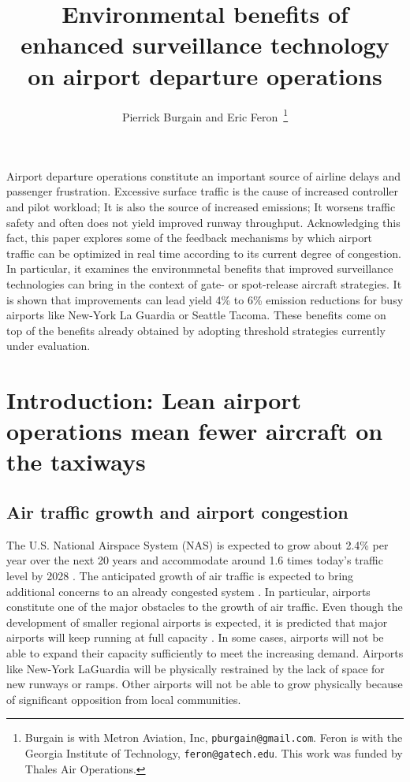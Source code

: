 \documentclass[letterpaper]{article}
\title{Environmental benefits of enhanced surveillance technology on airport departure operations}
\author{Pierrick Burgain and Eric Feron~\thanks{Burgain is with Metron Aviation, Inc, {\tt pburgain@gmail.com}. Feron is with the Georgia Institute of Technology, {\tt feron@gatech.edu}. This work was funded by Thales Air Operations.}}
\begin{document}

\maketitle


Airport departure operations constitute an important source of airline delays and passenger frustration. Excessive surface traffic is the cause of increased controller and pilot workload; It is also the source of increased emissions; It worsens traffic safety and often does not yield improved runway throughput. Acknowledging this fact, this paper explores some of the feedback mechanisms by which airport traffic can be optimized in real time according to its current degree of congestion. In particular, it examines the environmnetal benefits that improved surveillance technologies can bring in the context of gate- or spot-release aircraft strategies.
It is shown that improvements can lead yield 4\% to 6\% emission reductions for busy airports like New-York La Guardia or Seattle Tacoma. These benefits come on top of the benefits already obtained by adopting threshold strategies currently under evaluation.

\section{Introduction: Lean airport operations mean fewer aircraft on the taxiways}

\subsection{Air traffic growth and airport congestion}
The U.S. National Airspace System (NAS) is expected to grow about 2.4\% per year over the next 20 years and accommodate around 1.6 times today's traffic level by 2028 \cite{greenair2010,nextGen,Ky2006,Arbuckle2006}. The anticipated growth of air traffic is expected to bring additional concerns to an already congested system  \cite{Joint2004, Thanh2006}. In particular, airports constitute one of the major obstacles to the growth of air traffic.
Even though the development
of smaller regional airports is expected, it is predicted that major airports will keep running at full capacity \cite{nextGen}. In some cases, airports will not be able to expand their capacity sufficiently to
meet the increasing demand. Airports like New-York LaGuardia
will be physically restrained by the lack of space for new runways or
ramps. Other airports will not be able to grow physically because of significant opposition from local communities. 
\iffalse
\begin{figure}[ht]
\centering
\texttt{[image: Airbus\_GMF\_2009\_a.png]}
\caption[Worldwide air traffic growth projections]{Worldwide air traffic growth projections \cite{greenair2010}}
\label{airbusProj}
\end{figure}
\fi
\end{document}

